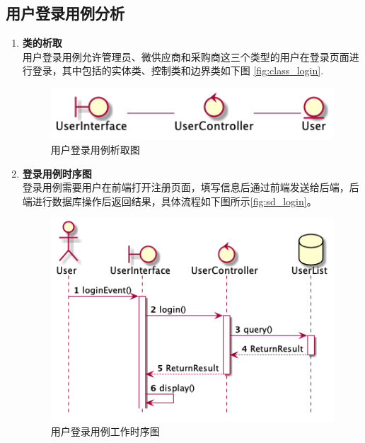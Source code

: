     \newpage
	\subsection{用户登录用例分析} %
	\label{sub:用户登录用例分析_name}
	\begin{enumerate}
		\item \textbf{类的析取} \\
		用户登录用例允许管理员、微供应商和采购商这三个类型的用户在登录页面进行登录，其中包括的实体类、控制类和边界类如下图
		\autoref{fig:class_login}.
		\begin{figure}[htp]
		    \centering
		    \includegraphics[width=12cm]{report/figure/classAnalyse/login.png}
		    \caption{用户登录用例析取图}
		    \label{fig:class_login}
		\end{figure}
		\item \textbf{登录用例时序图} \\
		登录用例需要用户在前端打开注册页面，填写信息后通过前端发送给后端，后端进行数据库操作后返回结果，具体流程如下图所示\autoref{fig:sd_login}。

		\begin{figure}[htp]
		    \centering
		    \includegraphics[width=12cm]{report/figure/sequenceDiagram/sd_login.png}
		    \caption{用户登录用例工作时序图}
		    \label{fig:sd_login}
		\end{figure}
	\end{enumerate}
	
